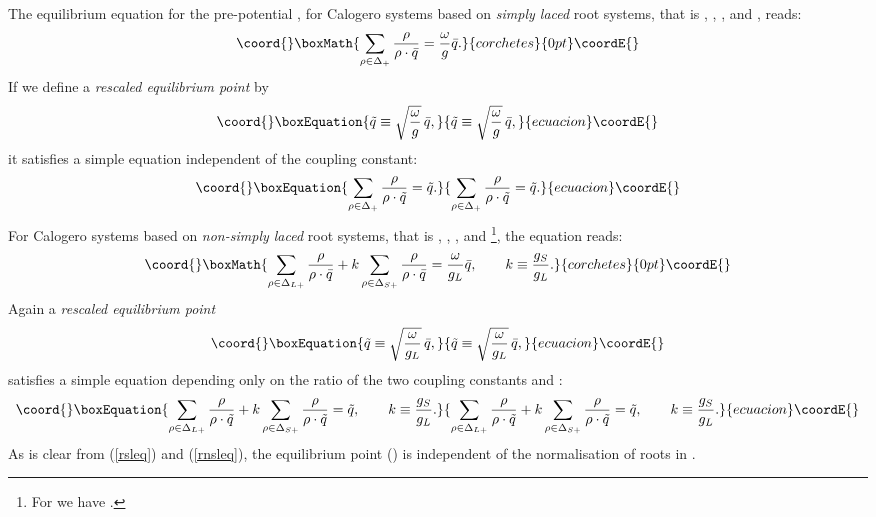 \documentclass[a4paper,12pt]{article}
\begin{document}
The equilibrium equation for the pre-potential \coordHE{},
for Calogero systems based on {\em simply laced\/} root systems,
that is \coordHE{}, \coordHE{}, \coordHE{}, \coordHE{} and \coordHE{}, reads:
\[\coord{}\boxMath{
   \sum_{\rho\in\Delta_+}{\rho\over{\rho\cdot\bar{q}}}={\omega\over{g}}\bar{q}.
}{corchetes}{0pt}\coordE{}\]
If we define a {\em rescaled equilibrium point\/} by
\begin{equation}\coord{}\boxEquation{
   \tilde{q}\equiv \sqrt{\omega\over g}\,\bar{q},
}{
   \tilde{q}\equiv \sqrt{\omega\over g}\,\bar{q},
}{ecuacion}\coordE{}\end{equation}
it satisfies a simple equation independent of the coupling constant:
\begin{equation}\coord{}\boxEquation{
   \sum_{\rho\in\Delta_+}{\rho\over{\rho\cdot\tilde{q}}}=\tilde{q}.
   \label{rsleq}
}{
   \sum_{\rho\in\Delta_+}{\rho\over{\rho\cdot\tilde{q}}}=\tilde{q}.
   }{ecuacion}\coordE{}\end{equation}
For Calogero systems based on {\em non-simply laced\/} root systems,
that is \coordHE{}, \coordHE{}, \coordHE{}, \coordHE{} and \coordHE{}%
\footnote{For \coordHE{} we have \coordHE{}.},
the equation reads:
\[\coord{}\boxMath{
   \sum_{\rho\in\Delta_{L+}}{\rho\over{\rho\cdot\bar{q}}}+
   k\sum_{\rho\in\Delta_{S+}}{\rho\over{\rho\cdot\bar{q}}}=
   {\omega\over{g_L}}\bar{q},
   \qquad k\equiv{g_S\over{g_L}}.
}{corchetes}{0pt}\coordE{}\]
Again a {\em rescaled equilibrium point\/}
\begin{equation}\coord{}\boxEquation{
   \tilde{q}\equiv \sqrt{\omega\over g_L}\,\bar{q},
}{
   \tilde{q}\equiv \sqrt{\omega\over g_L}\,\bar{q},
}{ecuacion}\coordE{}\end{equation}
satisfies a simple equation depending only on the ratio
of the two coupling constants \coordHE{} and \coordHE{}:
\begin{equation}\coord{}\boxEquation{
   \sum_{\rho\in\Delta_{L+}}{\rho\over{\rho\cdot\tilde{q}}}+
   k\sum_{\rho\in\Delta_{S+}}{\rho\over{\rho\cdot\tilde{q}}}=\tilde{q},
   \qquad k\equiv{g_S\over{g_L}}.
   \label{rnsleq}
}{
   \sum_{\rho\in\Delta_{L+}}{\rho\over{\rho\cdot\tilde{q}}}+
   k\sum_{\rho\in\Delta_{S+}}{\rho\over{\rho\cdot\tilde{q}}}=\tilde{q},
   \qquad k\equiv{g_S\over{g_L}}.
   }{ecuacion}\coordE{}\end{equation}
As is clear from (\ref{rsleq}) and (\ref{rnsleq}), the equilibrium
point \coordHE{} (\coordHE{}) is independent of the normalisation of
roots in \myHighlight{$\Delta$}\coordHE{}.
\end{document}
